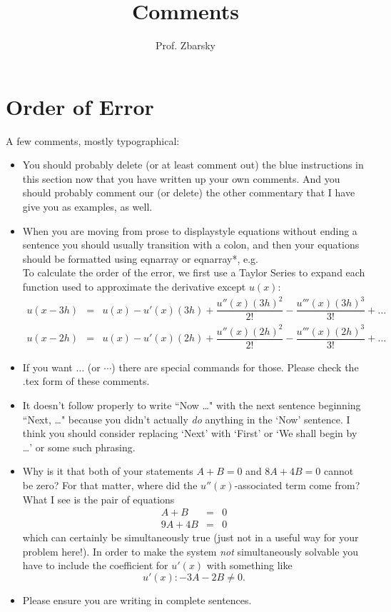 \documentclass{article}
\newcommand{\bea}{\begin{eqnarray*}}
\newcommand{\eea}{\end{eqnarray*}}
\begin{document}
\title{Comments}
\author{Prof. Zbarsky}
\section{Order of Error}
A few comments, mostly typographical:
\begin{itemize}
\item You should probably delete (or at least comment out) the blue instructions in this section now that you have written up your own comments. And you should probably comment our (or delete) the other commentary that I have give you as examples, as well. 
\item When you are moving from prose to displaystyle equations without ending a sentence you should usually transition with a colon, and then your equations should be formatted using eqnarray or eqnarray*, e.g. \\
To calculate the order of the error, we first use a Taylor Series to expand each function used to approximate the derivative except $u(x)$:
\bea
u(x-3h) &=& u(x) - u'(x)(3h) + \dfrac{u''(x)(3h)^2}{2!} -  \dfrac{u'''(x)(3h)^3}{3!}+\ldots \\
u(x-2h) &=& u(x) - u'(x)(2h) + \dfrac{u''(x)(2h)^2}{2!} - \dfrac{u'''(x)(2h)^3}{3!}+\ldots
\eea
\item If you want $\ldots$ (or $\cdots$) there are special commands for those. Please check the .tex form of these comments.
\item It doesn't follow properly to write ``Now \ldots" with the next sentence beginning ``Next, \ldots" because you didn't actually \emph{do} anything in the `Now' sentence. I think you should consider replacing `Next' with `First' or `We shall begin by \ldots' or some such phrasing.
\item Why is it that both of your statements $A+B=0$ and $8A+4B=0$ cannot be zero? For that matter, where did the $u''(x)$-associated term come from? What I see is the pair of equations \bea A+B &=& 0 \\ 9A+4B &=& 0 \eea which can certainly be simultaneously true (just not in a useful way for your problem here!). In order to make the system \emph{not} simultaneously solvable you have to include the coefficient for $u'(x)$ with something like $$u'(x): -3A-2B \neq 0.$$
\item Please ensure you are writing in complete sentences.
\end{itemize}
\end{document}
